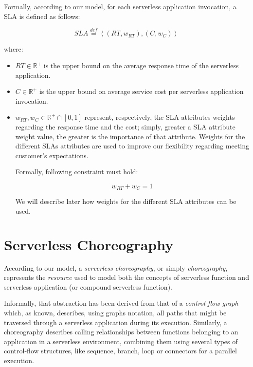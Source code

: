 \documentclass[12pt,a4paper]{report}
\newcommand{\mathDef}{\overset{\textit{def}}{=}}
\newcommand{\Rplus}{\mathbb{R}^+}
\begin{document}
Formally, according to our model, for each serverless application invocation, a SLA is defined as follows:

\begin{equation}
	SLA \mathDef \left\langle (RT,w_{RT}),(C,w_{C}) \right\rangle 
\end{equation}
   
where:

\begin{itemize}
	\item $RT \in \mathbb{R}^+$ is the upper bound on the average
	response time of the serverless application.
	
	\item $C \in \mathbb{R}^+$ is the upper bound on average service cost per serverless application invocation.
	
	\item $w_{RT}, w_{C} \in \Rplus \cap \left[ 0,1 \right]$ represent, respectively, the SLA attributes weights regarding the response time and the cost; simply, greater a SLA attribute weight value, the greater is the importance of that attribute. Weights for the different SLAs attributes are used to improve our flexibility regarding meeting customer's expectations. 
	
	Formally, following constraint must hold:
	
	\begin{equation}
		w_{RT} + w_{C} = 1
	\end{equation}

	We will describe later how weights for the different SLA attributes can be used.
\end{itemize}

\section{Serverless Choreography}

According to our model, a \textit{serverless choreography}, or simply \textit{choreography}, represents the \textit{resource} used to model both the concepts of serverless function and serverless application (or compound serverless function).

Informally, that abstraction has been derived from that of a \textit{control-flow graph} which, as known, describes, using graphs notation, all paths that might be traversed through a serverless application during its execution. Similarly, a choreography describes calling relationships between functions belonging to an application in a serverless environment, combining them using several types of control-flow structures, like sequence, branch, loop or connectors for a parallel execution. 
\end{document}
